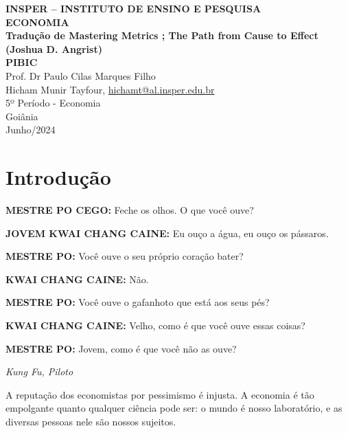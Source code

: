 \documentclass[a4paper,12pt]{article}[abntex2]
\begin{document}
\begin{titlepage}
    \centering
    \vspace*{1cm}
    \Large\textbf{INSPER – INSTITUTO DE ENSINO E PESQUISA}\\
    \Large \textbf{ECONOMIA}\\
    \vspace{1.5cm}
    \Large\textbf{Tradução  de Mastering Metrics ; The Path from Cause to Effect (Joshua D. Angrist)}\\
    \textbf{PIBIC}\\
    \vspace{1.5cm}
    Prof. Dr Paulo Cilas Marques Filho\\
    \vfill
    \normalsize
    Hicham Munir Tayfour, \href{mailto:hichamt@al.insper.edu.br}{hichamt@al.insper.edu.br}\\
    5º Período - Economia \\
    \vfill
    Goiânia\\
    Junho/2024
\end{titlepage}

\newpage
\tableofcontents
\thispagestyle{empty} %
\newpage
\setcounter{page}{1} %
\justify
\onehalfspacing

\pagestyle{fancy}
\fancyhf{}
\rhead{\thepage}

\section{Introdução}

\textbf{MESTRE PO CEGO:} Feche os olhos. O que você ouve?

\textbf{JOVEM KWAI CHANG CAINE:} Eu ouço a água, eu ouço os pássaros.

\textbf{MESTRE PO:} Você ouve o seu próprio coração bater?

\textbf{KWAI CHANG CAINE:} Não.

\textbf{MESTRE PO:} Você ouve o gafanhoto que está aos seus pés?

\textbf{KWAI CHANG CAINE:} Velho, como é que você ouve essas coisas?

\textbf{MESTRE PO:} Jovem, como é que você não as ouve?

\emph{Kung Fu, Piloto}

A reputação dos economistas por pessimismo é injusta. A economia é tão empolgante quanto qualquer ciência pode ser: o mundo é nosso laboratório, e as diversas pessoas nele são nossos sujeitos.
\end{document}
